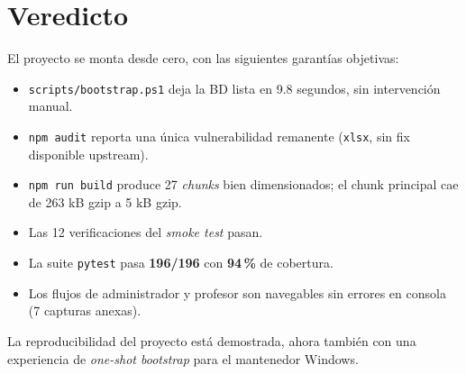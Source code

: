 \documentclass{computacion}
\begin{document}
\section{Veredicto}

El proyecto se monta desde cero, con las siguientes garantías objetivas:

\begin{itemize}
    \item \texttt{scripts/bootstrap.ps1} deja la BD lista en 9.8 segundos, sin intervención manual.
    \item \texttt{npm audit} reporta una única vulnerabilidad remanente (\texttt{xlsx}, sin fix disponible upstream).
    \item \texttt{npm run build} produce 27 \emph{chunks} bien dimensionados; el chunk principal cae de 263 kB gzip a 5 kB gzip.
    \item Las 12 verificaciones del \emph{smoke test} pasan.
    \item La suite \texttt{pytest} pasa \textbf{196/196} con \textbf{94\,\%} de cobertura.
    \item Los flujos de administrador y profesor son navegables sin errores en consola (7 capturas anexas).
\end{itemize}

La reproducibilidad del proyecto está demostrada, ahora también con una experiencia de \emph{one-shot bootstrap} para el mantenedor Windows.
\end{document}
